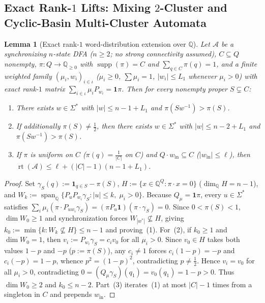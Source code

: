 \documentclass[11pt,a4paper]{article}
\newtheorem{lemma}[theorem]{Lemma}
\theoremstyle{definition}
\theoremstyle{remark}
\newcommand{\rt}{\operatorname{rt}}
\newcommand{\supp}{\operatorname{supp}}
\newcommand{\one}{\mathbf{1}}
\newcommand{\Q}{\mathbb{Q}}
\newcommand{\cA}{\mathcal{A}}
\begin{document}
\subsection{Exact Rank-\texorpdfstring{$1$}{1} Lifts: Mixing \texorpdfstring{$2$}{2}-Cluster and Cyclic-Basin Multi-Cluster Automata}

\begin{lemma}[Exact rank-$1$ word-distribution extension over $\Q$]
\label{lem:rank1}
Let $\cA$ be a synchronizing $n$-state DFA ($n \ge 2$; no strong connectivity assumed), $C \subseteq Q$ nonempty, $\pi : Q \to \Q_{\ge 0}$ with $\supp(\pi) = C$ and $\sum_{q \in C} \pi(q) = 1$, and a finite weighted family $(\mu_i, w_i)_{i \in \iota}$ ($\mu_i \ge 0$, $\sum \mu_i = 1$, $|w_i| \le L_1$ whenever $\mu_i > 0$) with exact rank-$1$ matrix $\sum_{i \in \iota} \mu_i P_{w_i} = \one \pi$. Then for every nonempty proper $S \subsetneq C$:
\begin{enumerate}[label=(\arabic*),nosep]
  \item There exists $w \in \Sigma^*$ with $|w| \le n - 1 + L_1$ and $\pi(S w^{-1}) > \pi(S)$.
  \item If additionally $\pi(S) \neq \frac{1}{2}$, then there exists $w \in \Sigma^*$ with $|w| \le n - 2 + L_1$ and $\pi(S w^{-1}) > \pi(S)$.
  \item If $\pi$ is uniform on $C$ ($\pi(q) = \frac{1}{|C|}$ on $C$) and $Q \cdot w_{\mathrm{in}} \subseteq C$ ($|w_{\mathrm{in}}| \le \ell$), then $\rt(\cA) \le \ell + (|C| - 1)(n - 1 + L_1)$.
\end{enumerate}
\end{lemma}
\begin{proof}
Set $\gamma_S(q) := \one_{q \in S} - \pi(S)$, $H := \{x \in \Q^Q : \pi \cdot x = 0\}$ ($\dim_\Q H = n - 1$), and $W_k := \operatorname{span}_\Q\{P_u P_{w_i} \gamma_S : |u| \le k,\; \mu_i > 0\}$. Because $Q_\mu = \one \pi$, every $u \in \Sigma^*$ satisfies $\sum_i \mu_i (\pi \cdot P_{u w_i} \gamma_S) = (\pi P_u \one)(\pi \cdot \gamma_S) = 0$. Since $0 < \pi(S) < 1$, $\dim W_0 \ge 1$ and synchronization forces $W_{|w^*|} \not\subseteq H$, giving $k_0 := \min\{k : W_k \not\subseteq H\} \le n - 1$ and proving~(1). For~(2), if $k_0 \ge 1$ and $\dim W_0 = 1$, then $v_i := P_{w_i}\gamma_S = c_i v_0$ for all $\mu_i > 0$. Since $v_0 \in H$ takes both values $1 - p$ and $-p$ ($p := \pi(S)$), any $c_i \neq 1$ forces $c_i(1-p) = -p$ and $c_i(-p) = 1-p$, whence $p^2 = (1-p)^2$, contradicting $p \neq \frac{1}{2}$. Hence $v_i = v_0$ for all $\mu_i > 0$, contradicting $0 = (Q_\mu \gamma_S)(q_1) = v_0(q_1) = 1 - p > 0$. Thus $\dim W_0 \ge 2$ and $k_0 \le n - 2$. Part~(3) iterates~(1) at most $|C|-1$ times from a singleton in $C$ and prepends $w_{\mathrm{in}}$.
\end{proof}
\end{document}
